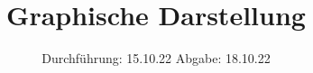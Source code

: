 

\subject{Übung 1}
\title{Graphische Darstellung}
\date{%
  Durchführung: 15.10.22
  \hspace{3em}
  Abgabe: 18.10.22
}



\maketitle
\thispagestyle{empty}
\tableofcontents
\newpage

%


%

\printbibliography{}


